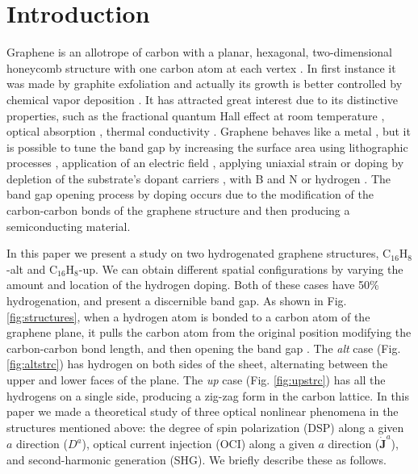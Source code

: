 \documentclass[pss]{wiley2sp} %
\begin{document}
\maketitle


\section{Introduction}\label{sec:intro}

Graphene is an allotrope of carbon with a planar, hexagonal, two-dimensional honeycomb structure with one carbon atom at each vertex \cite{geimNM07}. In first instance it was made by graphite exfoliation \cite{geimNM07} and actually its growth is better controlled by chemical vapor deposition \cite{reinaNL08}. It has attracted great interest due to its distinctive properties, such as the fractional quantum Hall effect at room temperature \cite{bottegoniAPL13}, optical absorption \cite{thongrattanasiriPRL12}, thermal conductivity \cite{balandinNL08}. Graphene behaves like a metal \cite{geimNM07}, but it is possible to tune the band gap by increasing the surface area using lithographic processes \cite{hanPRL07}, application of an electric field \cite{zhangN09}, applying uniaxial strain \cite{niACSN08} or doping by depletion of the substrate's dopant carriers \cite{ohtaS06}, with B and N \cite{guoIJ11} or hydrogen \cite{eliasS09,guisingerNL09,samarakoonACSN10}. The band gap opening process by doping occurs due to the modification of the carbon-carbon bonds of the graphene structure and then producing a semiconducting material.

In this paper we present a study on two hydrogenated graphene structures, C$_{16}$H$_{8}$-alt and C$_{16}$H$_{8}$-up. We can obtain different spatial configurations by varying the amount and location of the hydrogen doping. Both of these cases have 50\% hydrogenation, and present a discernible band gap. As shown in Fig. \ref{fig:structures}, when a hydrogen atom is bonded to a carbon atom of the graphene plane, it pulls the carbon atom from the original position modifying the carbon-carbon bond length, and then opening the band gap \cite{samarakoonACSN10}. The \emph{alt} case (Fig. \ref{fig:altstrc}) has hydrogen on both sides of the sheet, alternating between the upper and lower faces of the plane. The \emph{up} case (Fig. \ref{fig:upstrc}) has all the hydrogens on a single side, producing a zig-zag form in the carbon lattice. In this paper we made a theoretical study of three optical nonlinear phenomena in the structures mentioned above: the degree of spin polarization (DSP) along a given $a$ direction ($D^{a}$), optical current injection (OCI) along a given $a$ direction ($\mathbf{\dot{J}}^{a}$), and second-harmonic generation (SHG). We briefly describe these as follows.
\end{document}

